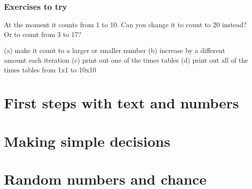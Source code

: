   \subsubsection{Exercises to try}


  At the moment it counts from 1 to 10.  Can you change it to count to 20 instead?  Or to count from 3 to 17?
  
  (a) make it count  to a larger or smaller number
 (b) increase by a different amount each iteration
 (c) print out one of the times tables
(d) print out all of the times tables from 1x1 to 10x10


  
  
  
\section{First steps with text and numbers}

\section{Making simple decisions}

\section{Random numbers and chance}
